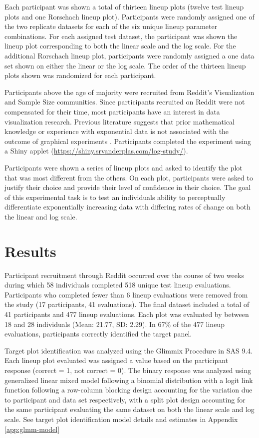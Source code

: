 \documentclass[]{interact}
\theoremstyle{plain}%
\theoremstyle{definition}
\theoremstyle{remark}
\begin{document}
Each participant was shown a total of thirteen lineup plots (twelve test
lineup plots and one Rorschach lineup plot). Participants were randomly
assigned one of the two replicate datasets for each of the six unique
lineup parameter combinations. For each assigned test dataset, the
participant was shown the lineup plot corresponding to both the linear
scale and the log scale. For the additional Rorschach lineup plot,
participants were randomly assigned a one data set shown on either the
linear or the log scale. The order of the thirteen lineup plots shown
was randomized for each participant.

Participants above the age of majority were recruited from Reddit's
Visualization and Sample Size communities. Since participants recruited
on Reddit were not compensated for their time, most participants have an
interest in data visualization research. Previous literature suggests
that prior mathematical knowledge or experience with exponential data is
not associated with the outcome of graphical experiments
\citep{vanderplasSpatialReasoningData2016}. Participants completed the
experiment using a Shiny applet
(\url{https://shiny.srvanderplas.com/log-study/}).

Participants were shown a series of lineup plots and asked to identify
the plot that was most different from the others. On each plot,
participants were asked to justify their choice and provide their level
of confidence in their choice. The goal of this experimental task is to
test an individuals ability to perceptually differentiate exponentially
increasing data with differing rates of change on both the linear and
log scale.

\hypertarget{results}{%
\section{Results}\label{results}}

Participant recruitment through Reddit occurred over the course of two
weeks during which 58 individuals completed 518 unique test lineup
evaluations. Participants who completed fewer than 6 lineup evaluations
were removed from the study (17 participants, 41 evaluations). The final
dataset included a total of 41 participants and 477 lineup evaluations.
Each plot was evaluated by between 18 and 28 individuals (Mean: 21.77,
SD: 2.29). In 67\% of the 477 lineup evaluations, participants correctly
identified the target panel.

Target plot identification was analyzed using the Glimmix Procedure in
SAS 9.4. Each lineup plot evaluated was assigned a value based on the
participant response (correct = 1, not correct = 0). The binary response
was analyzed using generalized linear mixed model following a binomial
distribution with a logit link function following a row-column blocking
design accounting for the variation due to participant and data set
respectively, with a split plot design accounting for the same
participant evaluating the same dataset on both the linear scale and log
scale. See target plot identification model details and estimates in
Appendix \ref{app:glmm-model}
\end{document}
